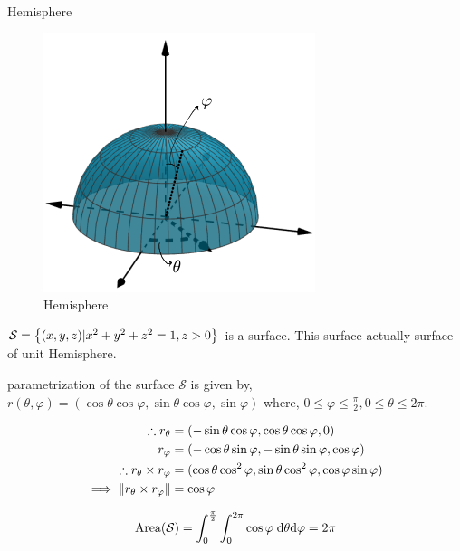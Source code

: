 \documentclass[../Analysis-3]{subfiles}
\begin{document}
\begin{Eg}{Hemisphere}{}
    
    \begin{figure}
        \centering
        \includegraphics[width=.78\linewidth]{../figures/lec-26.2.png}
        \caption{Hemisphere}
    \end{figure}

    $\mathcal{S} = \qty{(x,y,z) | x^2+y^2+z^2 = 1 , z >0 }$ is a surface. This surface actually surface of unit Hemisphere.
 
    parametrization of the surface $\mathcal{S}$ is given by, $r(\theta, \varphi) = (\cos \theta \cos \varphi, \sin \theta \cos \varphi , \sin \varphi)$ where, $0 \le \varphi \le \frac{\pi}{2} , 0 \le \theta \le 2\pi$.

    \begin{align*}
        \therefore r_{\theta} &= (-\sin \theta \cos \varphi, \cos \theta \cos \varphi, 0) \\
        r_{\varphi} &= (-\cos \theta \sin \varphi,-\sin \theta \sin \varphi , \cos \varphi) \\
        \therefore r_{\theta} \times r_{\varphi} &= (\cos \theta \cos ^2 \varphi, \sin \theta \cos ^2\varphi, \cos \varphi  \sin \varphi) \\
        \implies \norm{r_{\theta} \times r_{\varphi}} &= \cos \varphi 
    \end{align*}

    \[\text{Area}(\mathcal{S}) = \int_{0}^{\frac{\pi}{2}}\int_{0}^{2\pi} \cos \varphi \hspace{0.1cm} \dd \theta \dd \varphi = 2\pi \]

\end{Eg}
\end{document}

